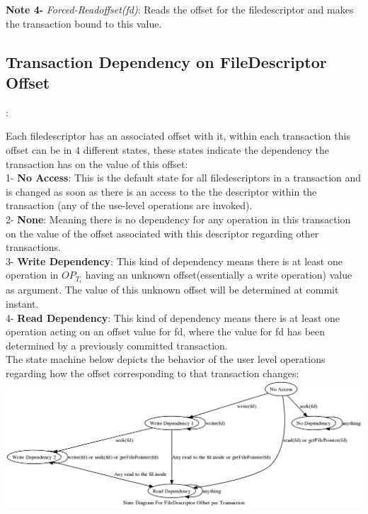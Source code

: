 \documentclass[a4paper, 11pt]{article}
\begin{document}
\textbf{Note 4-} \emph{Forced-Readoffset(fd)}: Reads the offset for the filedescriptor and makes the transaction bound to this value.\\

\subsection{Transaction Dependency on FileDescriptor Offset}:

Each filedescriptor has an associated offset with it, within each transaction this offset can be in 4 different states, these states indicate the dependency the transaction has on the value of this offset:\\

1- \textbf{No Access}: This is the default state for all filedescriptors in a transaction and is changed as soon as there is an access to the the descriptor within the transaction (any of the use-level operations are invoked).\\

2- \textbf{None}: Meaning there is no dependency for any operation in this transaction on the value of the offset associated with this descriptor regarding other transactions.\\ %

3- \textbf{Write Dependency}: This kind of dependency means there is at least one operation in $OP_{T_i}$ having an unknown offset(essentially a write operation) value as argument. The value of this unknown offset will be determined at commit instant. \\

4- \textbf{Read Dependency}: This kind of dependency means there is at least one operation acting on an offset value for fd, where the value for fd has been determined by a previously committed transaction.\\


The state machine below depicts the behavior of the user level operations regarding how the offset corresponding to that transaction changes: \\

\includegraphics[scale = 0.3]{hello.png}\\
\end{document}
